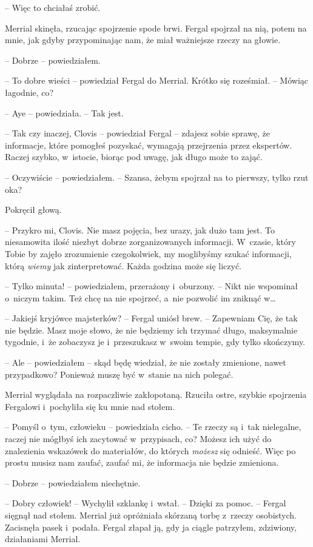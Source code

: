 \documentclass[oneside,polish,11pt,sfheadings]{mwbk}
\begin{document}
-- Więc to chciałaś zrobić.

Merrial skinęła, rzucając spojrzenie spode brwi. Fergal spojrzał na nią,
potem na mnie, jak gdyby przypominając nam, że miał ważniejsze rzeczy na
głowie.

-- Dobrze -- powiedziałem.

-- To dobre wieści -- powiedział Fergal do Merrial. Krótko się roześmiał.
-- Mówiąc łagodnie, co?

-- Aye -- powiedziała. -- Tak jest.

-- Tak czy inaczej, Clovis -- powiedział Fergal -- zdajesz sobie sprawę, że
informacje, które pomogłeś pozyskać, wymagają przejrzenia przez
ekspertów. Raczej szybko, w~istocie, biorąc pod uwagę, jak długo może to
zająć.

-- Oczywiście -- powiedziałem. -- Szansa, żebym spojrzał na to pierwszy,
tylko rzut oka?

Pokręcił głową. 

-- Przykro mi, Clovis. Nie masz pojęcia, bez urazy, jak
dużo tam jest. To niesamowita ilość niezbyt dobrze zorganizowanych
informacji. W~czasie, który Tobie by zajęło zrozumienie czegokolwiek, my
moglibyśmy szukać informacji, którą \textit{wiemy} jak zinterpretować.
Każda godzina może się liczyć.

-- Tylko minuta! -- powiedziałem, przerażony i~oburzony. -- Nikt nie
wspominał o~niczym takim. Też chcę na nie spojrzeć, a~nie pozwolić im
zniknąć w\ldots

-- Jakiejś kryjówce majsterków? -- Fergal uniósł brew. -- Zapewniam Cię, że
tak nie będzie. Masz moje słowo, że nie będziemy ich trzymać długo,
maksymalnie tygodnie, i~że zobaczysz je i~przeszukasz w~swoim tempie,
gdy tylko skończymy.

-- Ale -- powiedziałem -- skąd będę wiedział, że nie zostały zmienione,
nawet przypadkowo? Ponieważ muszę być w~stanie na nich polegać.

Merrial wyglądała na rozpaczliwie zakłopotaną. Rzuciła ostre, szybkie
spojrzenia Fergalowi i~pochyliła się ku mnie nad stołem.

-- Pomyśl o~tym, człowieku -- powiedziała cicho. -- Te rzeczy są i~tak
nielegalne, raczej nie mógłbyś ich zacytować w~przypisach, co? Możesz
ich użyć do znalezienia wskazówek do materiałów, do których
\textit{możesz} się odnieść. Więc po prostu musisz nam zaufać, zaufać mi,
że informacja nie będzie zmieniona.

-- Dobrze -- powiedziałem niechętnie.

-- Dobry człowiek! -- Wychylił szklankę i~wstał. -- Dzięki za pomoc. -- Fergal sięgnął nad stołem. Merrial już opróżniała skórzaną torbę z~rzeczy osobistych. Zacisnęła pasek i~podała. Fergal złapał ją, gdy ja
ciągle patrzyłem, zdziwiony, działaniami Merrial.
\end{document}
